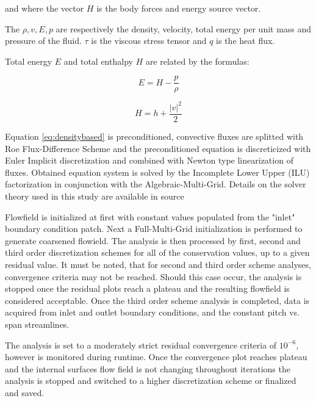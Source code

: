 \noindent and where the vector $H$ is the body forces and energy source vector.

The $\rho, v, E, p$ are respectively the density, velocity, total energy per unit mass and pressure of the fluid. $\tau$ is the viscous stress tensor and $q$ is the heat flux.

Total energy $E$ and total enthalpy $H$ are related by the formulas:

\begin{equation} \label{eq:totalenergy}
E = H - \frac{p}{\rho}
\end{equation}

\begin{equation} \label{eq:totalenthalpy}
H = h + \frac{\lvert v \rvert^2}{2} 
\end{equation}

Equation \ref{eq:densitybased} is preconditioned, convective fluxes are splitted with Roe Flux-Difference Scheme and the preconditioned equation is discreticized with Euler Implicit discretization and combined with Newton type linearization of fluxes. Obtained equation system is solved by the Incomplete Lower Upper (ILU) factorization in conjunction with the Algebraic-Multi-Grid. Details on the solver theory used in this study are available in source \citep{fluenttheory}

Flowfield is initialized at first with constant values populated from the "inlet" boundary condition patch. Next a Full-Multi-Grid initialization is performed to generate coarsened flowield. The analysis is then processed by first, second and third order discretization schemes for all of the conservation values, up to a given residual value. It must be noted, that for second and third order scheme analyses, convergence criteria may not be reached. Should this case occur, the analysis is stopped once the residual plots reach a plateau and the resulting flowfield is considered acceptable. Once the third order scheme analysis is completed, data is acquired from inlet and outlet boundary conditions, and the constant pitch vs. span streamlines.

The analysis is set to a moderately strict residual convergence criteria of $10^{-6}$, however is monitored during runtime. Once the convergence plot reaches plateau and the internal surfaces flow field is not changing throughout iterations the analysis is stopped and switched to a higher discretization scheme or finalized and saved.

